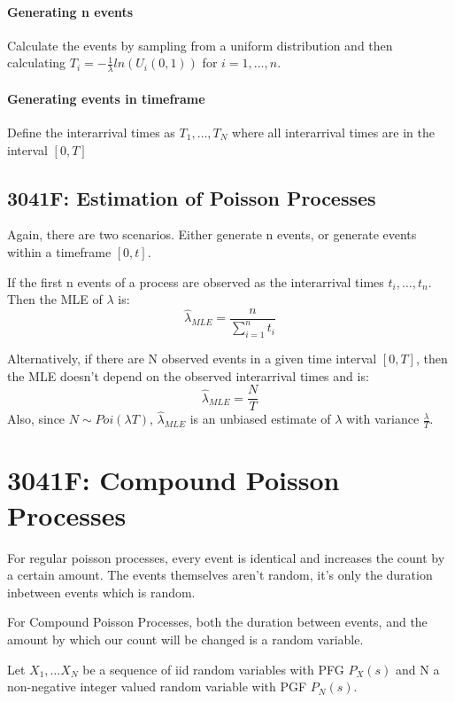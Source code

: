 \paragraph{Generating n events} Calculate the events by sampling from a uniform distribution and then calculating \(T_i = -\frac{1}{\lambda} ln(U_i(0,  1))\) for \(i = 1, \dots, n\). 
\paragraph{Generating events in timeframe} Define the interarrival times as \(T_1, \dots, 
T_N\) where all interarrival times are in the interval \([0, T]\)
\subsection{3041F: Estimation of Poisson Processes}
Again, there are two scenarios. Either generate n events, or generate events within a timeframe \([0, t]\).

If the first n events of a process are observed as the interarrival times \(t_i, \dots, t_n\). Then the MLE of \(\lambda\) is:
\begin{equation*}
    \hat{\lambda}_{MLE} = \frac{n}{\sum_{i=1}^{n}t_i}
\end{equation*}


Alternatively, if there are N observed events in a given time interval \([0, T]\), then the MLE doesn't depend on the observed interarrival times and is:
\begin{equation*}
    \hat{\lambda}_{MLE} = \frac{N}{T}
\end{equation*}
Also, since \(N \sim Poi(\lambda T)\), \(\hat{\lambda}_{MLE}\) is an unbiased estimate of 
\(\lambda\) with variance \(\frac{\lambda}{T}\).
\section{3041F: Compound Poisson Processes}
For regular poisson processes, every event is identical and increases the count by a 
certain amount. The events themselves aren't random, it's only the duration inbetween
events which is random.

For Compound Poisson Processes, both the duration between events, and the amount by 
which our count will be changed is a random variable.

Let \(X_1, \dots X_N\) be a sequence of iid random variables with PFG \(P_X(s)\) and N a non-negative integer valued random variable with PGF \(P_N(s)\).

